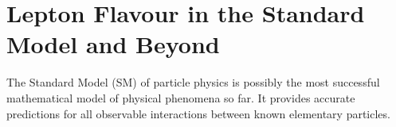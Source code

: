 \chapter{Lepton Flavour in the Standard Model and Beyond}\label{chapter1}







The Standard Model (SM) of particle physics is possibly the most successful
mathematical model of physical phenomena so far. It provides accurate
predictions for all observable interactions between known elementary particles.








